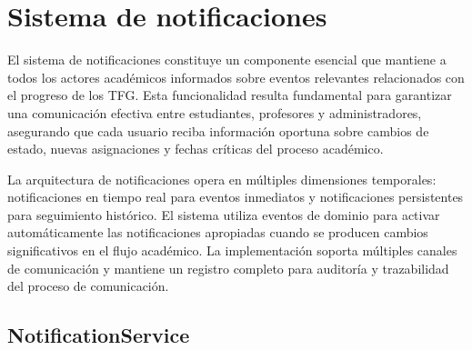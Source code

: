 \documentclass[12pt,a4paper,oneside]{report}
\begin{document}
\section{Sistema de notificaciones}\label{sistema-de-notificaciones}

El sistema de notificaciones constituye un componente esencial que mantiene a todos los actores académicos informados sobre eventos relevantes relacionados con el progreso de los TFG. Esta funcionalidad resulta fundamental para garantizar una comunicación efectiva entre estudiantes, profesores y administradores, asegurando que cada usuario reciba información oportuna sobre cambios de estado, nuevas asignaciones y fechas críticas del proceso académico.

La arquitectura de notificaciones opera en múltiples dimensiones temporales: notificaciones en tiempo real para eventos inmediatos y notificaciones persistentes para seguimiento histórico. El sistema utiliza eventos de dominio para activar automáticamente las notificaciones apropiadas cuando se producen cambios significativos en el flujo académico. La implementación soporta múltiples canales de comunicación y mantiene un registro completo para auditoría y trazabilidad del proceso de comunicación.

\subsection{NotificationService}\label{notificationservice}
\end{document}
